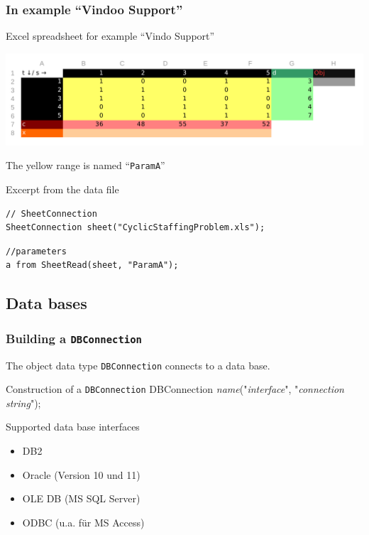 \begin{frame}[fragile]
 \frametitle{In example ``Vindoo Support''}
 \begin{block}{Excel spreadsheet for example ``Vindo Support''}
  \begin{center}
   \includegraphics[width=.9\linewidth]{Bilder/CyclicStaffingData}
  \end{center}\vspace{-1\baselineskip}
  The yellow range is named ``\texttt{ParamA}''
 \end{block}
 \begin{block}{Excerpt from the data file}
\begin{lstlisting}[language=opldata,numbers=none,basicstyle=\ttfamily\scriptsize]
// SheetConnection
SheetConnection sheet("CyclicStaffingProblem.xls");
\end{lstlisting}\vspace{-2\baselineskip}
\begin{lstlisting}[language=opldata,numbers=none,basicstyle=\ttfamily\scriptsize]
//parameters
a from SheetRead(sheet, "ParamA");
\end{lstlisting}
 \end{block}
\end{frame}

\subsection{Data bases}
\begin{frame}
 \frametitle{Building a \texttt{DBConnection}}
 The object data type \texttt{DBConnection} connects to a data base.
 \begin{block}{Construction of a \texttt{DBConnection}}
  \ttfamily
  DBConnection \textsf{\slshape name}("\textsf{\slshape interface}", "\textsf{\slshape connection string}");
 \end{block}
 \begin{block}{Supported data base interfaces}
  \begin{itemize}
   \item DB2
   \item Oracle (Version 10 und 11)
   \item OLE DB (MS SQL Server)
   \item ODBC (u.a. für MS Access)
  \end{itemize}
 \end{block}
\end{frame}

